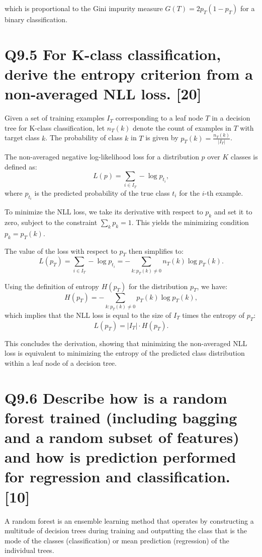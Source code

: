 \documentclass[11pt]{article}
\begin{document}
which is proportional to the Gini impurity measure \( G(T) = 2p_T(1 - p_T) \) for a binary classification.

\section{Q9.5 For K-class classification, derive the entropy criterion from a non-averaged NLL loss. [20]}

Given a set of training examples \(I_T\) corresponding to a leaf node \(T\) in a decision tree for K-class classification, let \(n_T(k)\) denote the count of examples in \(T\) with target class \(k\). The probability of class \(k\) in \(T\) is given by \(p_T(k) = \frac{n_T(k)}{|I_T|}\).

The non-averaged negative log-likelihood loss for a distribution \(p\) over \(K\) classes is defined as:
\[
L(p) = \sum_{i \in I_T} -\log p_{t_i},
\]
where \(p_{t_i}\) is the predicted probability of the true class \(t_i\) for the \(i\)-th example.

To minimize the NLL loss, we take its derivative with respect to \(p_k\) and set it to zero, subject to the constraint \(\sum_k p_k = 1\). This yields the minimizing condition \(p_k = p_T(k)\).

The value of the loss with respect to \(p_T\) then simplifies to:
\[
L(p_T) = \sum_{i \in I_T} -\log p_{t_i} = -\sum_{k: p_T(k) \neq 0} n_T(k) \log p_T(k).
\]

Using the definition of entropy \(H(p_T)\) for the distribution \(p_T\), we have:
\[
H(p_T) = -\sum_{k: p_T(k) \neq 0} p_T(k) \log p_T(k),
\]
which implies that the NLL loss is equal to the size of \(I_T\) times the entropy of \(p_T\):
\[
L(p_T) = |I_T| \cdot H(p_T).
\]

This concludes the derivation, showing that minimizing the non-averaged NLL loss is equivalent to minimizing the entropy of the predicted class distribution within a leaf node of a decision tree.

\section{Q9.6 Describe how is a random forest trained (including bagging and a random subset of features) and how is prediction performed for regression and classification. [10]}

A random forest is an ensemble learning method that operates by constructing a multitude of decision trees during training and outputting the class that is the mode of the classes (classification) or mean prediction (regression) of the individual trees.
\end{document}
